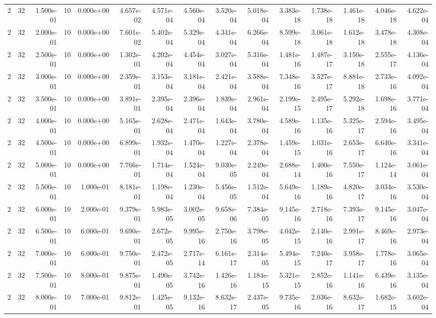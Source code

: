 \begin{tabular}{rrrrrrrrrrrrrrr}
2 & 32 & 1.500e-01 & 10 & 0.000e+00 & 4.657e-02 & 4.571e-04 & 4.560e-04 & 3.520e-04 & 5.018e-04 & 3.383e-18 & 1.738e-18 & 1.461e-18 & 4.046e-18 & 4.622e-04 \\
2 & 32 & 2.000e-01 & 10 & 0.000e+00 & 7.601e-02 & 5.402e-04 & 5.329e-04 & 4.341e-04 & 6.266e-04 & 8.599e-18 & 3.061e-18 & 1.612e-18 & 3.478e-18 & 4.308e-04 \\
2 & 32 & 2.500e-01 & 10 & 0.000e+00 & 1.302e-01 & 4.202e-04 & 4.454e-04 & 3.027e-04 & 5.316e-04 & 1.481e-16 & 1.487e-17 & 3.150e-18 & 2.555e-17 & 4.136e-04 \\
2 & 32 & 3.000e-01 & 10 & 0.000e+00 & 2.359e-01 & 3.153e-04 & 3.181e-04 & 2.421e-04 & 3.588e-04 & 7.348e-16 & 3.527e-17 & 8.881e-18 & 2.733e-16 & 4.092e-04 \\
2 & 32 & 3.500e-01 & 10 & 0.000e+00 & 3.891e-01 & 2.395e-04 & 2.396e-04 & 1.839e-04 & 2.961e-04 & 2.199e-15 & 2.495e-17 & 5.292e-18 & 1.698e-16 & 3.771e-04 \\
2 & 32 & 4.000e-01 & 10 & 0.000e+00 & 5.165e-01 & 2.628e-04 & 2.471e-04 & 1.643e-04 & 3.780e-04 & 4.589e-16 & 1.135e-16 & 5.325e-17 & 2.594e-16 & 3.495e-04 \\
2 & 32 & 4.500e-01 & 10 & 0.000e+00 & 6.899e-01 & 1.932e-04 & 1.470e-04 & 1.227e-04 & 2.378e-04 & 1.459e-15 & 1.031e-16 & 2.653e-17 & 6.640e-16 & 3.341e-04 \\
2 & 32 & 5.000e-01 & 10 & 0.000e+00 & 7.766e-01 & 1.714e-04 & 1.524e-04 & 9.030e-05 & 2.249e-04 & 2.688e-14 & 1.400e-16 & 7.550e-17 & 1.124e-14 & 3.061e-04 \\
2 & 32 & 5.500e-01 & 10 & 1.000e-01 & 8.181e-01 & 1.198e-04 & 1.230e-04 & 5.456e-05 & 1.512e-04 & 5.649e-16 & 1.189e-16 & 4.820e-17 & 3.034e-16 & 3.530e-04 \\
2 & 32 & 6.000e-01 & 10 & 2.000e-01 & 9.379e-01 & 5.983e-05 & 3.002e-05 & 9.658e-06 & 7.384e-05 & 9.145e-16 & 2.718e-16 & 7.393e-17 & 9.145e-16 & 3.047e-04 \\
2 & 32 & 6.500e-01 & 10 & 6.000e-01 & 9.690e-01 & 2.672e-05 & 9.995e-16 & 2.750e-16 & 3.798e-05 & 4.042e-15 & 2.140e-16 & 2.991e-17 & 8.469e-16 & 2.973e-04 \\
2 & 32 & 7.000e-01 & 10 & 6.000e-01 & 9.750e-01 & 2.472e-05 & 2.717e-14 & 6.161e-17 & 2.314e-05 & 5.494e-15 & 7.240e-17 & 3.958e-17 & 1.778e-16 & 3.065e-04 \\
2 & 32 & 7.500e-01 & 10 & 8.000e-01 & 9.875e-01 & 1.490e-05 & 3.742e-16 & 1.426e-16 & 1.184e-15 & 5.321e-15 & 2.852e-16 & 1.141e-16 & 6.439e-16 & 3.135e-04 \\
2 & 32 & 8.000e-01 & 10 & 7.000e-01 & 9.812e-01 & 1.425e-05 & 9.132e-16 & 8.632e-17 & 2.437e-05 & 9.735e-16 & 2.036e-16 & 8.632e-17 & 1.682e-15 & 3.602e-04 \\

\end{tabular}
